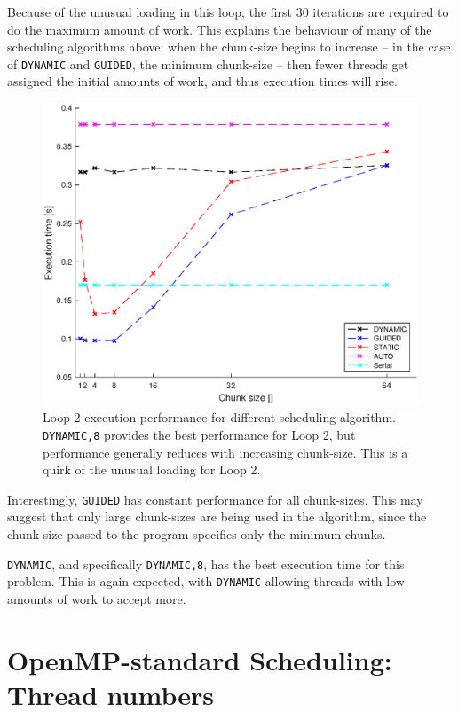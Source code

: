 \documentclass{article} %
\newcommand{\tp}{\texttt}
\begin{document}
Because of the unusual loading in this loop, the first 30 iterations are required to do the maximum amount of work.
This explains the behaviour of many of the scheduling algorithms above: when the chunk-size begins to increase -- in the case of \tp{DYNAMIC} and \tp{GUIDED}, the minimum chunk-size -- then fewer threads get assigned the initial amounts of work, and thus execution times will rise.

\begin{figure}
    \centering
    \includegraphics[height=.35\textheight]{part1_plots/all_part2.eps}
    \caption{Loop 2 execution performance for different scheduling algorithm. \tp{DYNAMIC,8} provides the best performance for Loop 2, but performance generally reduces with increasing chunk-size.
    This is a quirk of the unusual loading for Loop 2.}
    \label{fig:loop2results}
\end{figure}

Interestingly, \tp{GUIDED} has constant performance for all chunk-sizes.
This may suggest that only large chunk-sizes are being used in the algorithm, since the chunk-size passed to the program specifies only the minimum chunks. 

\tp{DYNAMIC}, and specifically \tp{DYNAMIC,8}, has the best execution time for this problem. This is again expected, with \tp{DYNAMIC} allowing threads with low amounts of work to accept more.

\section*{OpenMP-standard Scheduling: Thread numbers}
\end{document}
